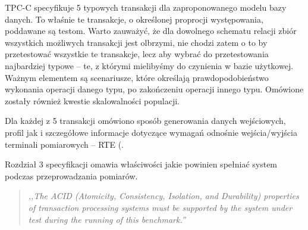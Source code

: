 TPC-C specyfikuje 5 typowych transakcji dla zaproponowanego modelu bazy danych.
To właśnie te transakcje, o określonej proprocji występowania, poddawane są testom. 
Warto zauważyć, że dla dowolnego schematu relacji zbiór wszystkich możliwych transakcji jest olbrzymi,
nie chodzi zatem o to by przetestować wszystkie te transakcje, lecz aby wybrać
do przetestowania najbardziej typowe -- te, z którymi mielibyśmy do czynienia
w bazie użytkowej. Ważnym elementem są scenariusze, które określają prawdopodobieństwo
wykonania operacji danego typu, po zakończeniu operacji innego typu. Omówione zostały również 
kwestie skalowalności populacji.

Dla każdej z 5 transakcji omówiono sposób generowania danych wejściowych,
profil jak i szczegółowe informacje dotyczące wymagań odnośnie wejścia/wyjścia 
terminali pomiarowych -- RTE (.

Rozdział 3 specyfikacji omawia właściwości jakie powinien spełniać system
podczas przeprowadzania pomiarów.

\begin{quote}\textit{,,The ACID (Atomicity, Consistency, Isolation, and Durability) properties of 
transaction processing systems must be supported by the system under test 
during the running of this benchmark.\cite{TPC2}''}\end{quote}

